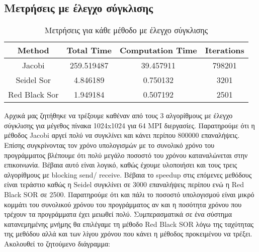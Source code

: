 \documentclass[11pt,a4paper]{article}
\begin{document}
\subsection*{Μετρήσεις με έλεγχο σύγκλισης}
\begin{table}[!h]
    \centering
    \begin{tabular}{|c|c|c|c|}
        \hline
        Method & Total Time & Computation Time & Iterations \\
        \hline
        \hline
        Jacobi & 259.519487 & 39.457911 & 798201 \\
        \hline 
        Seidel Sor & 4.846189 & 0.750132 & 3201 \\
        \hline
        Red Black Sor & 1.949184 & 0.507192 & 2501 \\
        \hline
    \end{tabular}
    \caption{Μετρήσεις για κάθε μέθοδο με έλεγχο σύγκλισης}
\end{table}
Αρχικά μας ζητήθηκε να τρέξουμε καθέναν από τους 3 αλγορίθμους με έλεγχο σύγκλισης για μέγεθος πίνακα 1024x1024 για 64 MPI διεργασίες. Παρατηρούμε ότι η μέθοδος
Jacobi αργεί πολύ να συγκλίνει και κάνει περίπου 800000 επαναλήψεις. Επίσης συγκρίνοντας τον χρόνο υπολογισμών με το συνολικό χρόνο του προγράμματος βλέπουμε ότι
πολύ μεγάλο ποσοστό του χρόνου καταναλώνεται στην επικοινωνία. Βέβαια αυτό είναι λογικό, καθώς έχουμε υλοποιήσει και τους τρεις αλγορίθμους με blocking send/
receive. Βέβαια το speedup στις επόμενες μεθόδους είναι τεράστιο καθώς η Seidel συγκλίνει σε 3000 επαναλήψεις περίπου ενώ η Red Black SOR σε 2500. Παρατηρούμε
ότι και πάλι το ποσοστό υπολογισμού είναι μικρό κομμάτι του συνολικού χρόνου του προγράμματος αν και η ποσότητα χρόνου που τρέχουν τα προγράμματα έχει μειωθεί πολύ.
Συμπερασματικά σε ένα σύστημα κατανεμημένης μνήμης θα επιλέγαμε τη μέθοδο Red Black SOR λόγω της ταχύτητας της μεθόδου αλλά και των λίγου χρόνου που κάνει η 
μέθοδος προκειμένου να τρέξει.
Ακολουθεί το ζητούμενο διάγραμμα:
\end{document}
